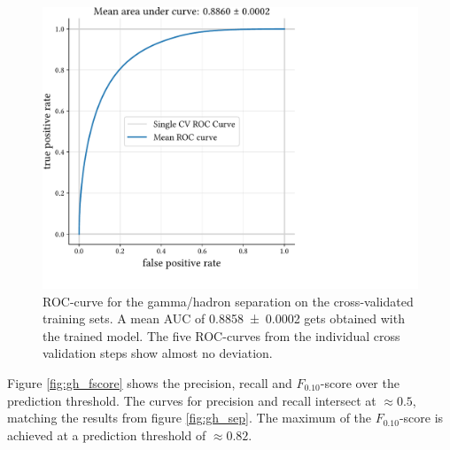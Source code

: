 \begin{figure}
    \centering
    \captionsetup{width=0.9\linewidth}
    \hspace*{0.15\textwidth}\includegraphics[page=1, width=.9\textwidth]{../analysis/plots/cross_val_sep_perf_plot.pdf}
    \caption{ROC-curve for the gamma/hadron separation on the cross-validated training sets.
    A mean AUC of \num{0.8858 \pm 0.0002} gets obtained with the trained model.
    The five ROC-curves from the individual cross validation steps show almost no deviation.}
    \label{fig:gh_roc}
\end{figure}

Figure \ref{fig:gh_fscore} shows the precision, recall and $F_{\num{0.10}}$-score over
the prediction threshold.
The curves for precision and recall intersect at $\approx 0.5$, matching the 
results from figure \ref{fig:gh_sep}.
The maximum of the $F_{\num{0.10}}$-score is achieved at a prediction
threshold of  $\approx \num{0.82}$.

